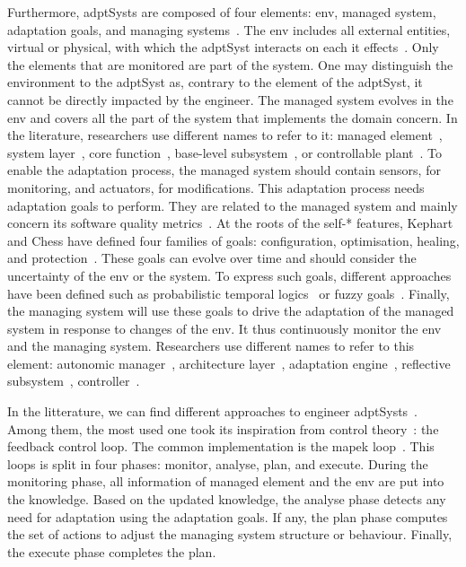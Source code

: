 Furthermore, \glspl{adptSyst} are composed of four elements: \gls{env}, managed system, adaptation goals, and managing systems~\cite{DBLP:books/sp/19/Weyns19}.
The \gls{env} includes all external entities, virtual or physical, with which the \gls{adptSyst} interacts on each it effects~\cite{DBLP:journals/ansoft/Jackson97}.
Only the elements that are monitored are part of the system.
One may distinguish the environment to the \gls{adptSyst} as, contrary to the element of the \gls{adptSyst}, it cannot be directly impacted by the engineer.
The managed system evolves in the \gls{env} and covers all the part of the system that implements the domain concern.
In the literature, researchers use different names to refer to it: managed element~\cite{DBLP:journals/computer/KephartC03}, system layer~\cite{DBLP:journals/computer/GarlanCHSS04}, core function~\cite{DBLP:journals/taas/SalehieT09}, base-level subsystem~\cite{DBLP:journals/taas/WeynsMA12}, or controllable plant~\cite{DBLP:conf/icse/FilieriHM14}.
To enable the adaptation process, the managed system should contain sensors, for monitoring, and actuators, for modifications.
This adaptation process needs adaptation goals to perform.
They are related to the managed system and mainly concern its software quality metrics~\cite{DBLP:conf/ecsa/WeynsA13}.
At the roots of the self-* features, Kephart and Chess have defined four families of goals: configuration, optimisation, healing, and protection~\cite{DBLP:journals/computer/KephartC03}.  
These goals can evolve over time and should consider the uncertainty of the \gls{env} or the system.
To express such goals, different approaches have been defined such as probabilistic temporal logics~\cite{DBLP:journals/tse/CalinescuGKMT11} or fuzzy goals~\cite{DBLP:conf/re/BaresiPS10}.
Finally, the managing system will use these goals to drive the adaptation of the managed system in response to changes of the \gls{env}.
It thus continuously monitor the \gls{env} and the managing system.
Researchers use different names to refer to this element: autonomic manager~\cite{DBLP:journals/computer/KephartC03}, architecture layer~\cite{DBLP:journals/computer/GarlanCHSS04}, adaptation engine~\cite{DBLP:journals/taas/SalehieT09}, reflective subsystem~\cite{DBLP:journals/taas/WeynsMA12}, controller~\cite{DBLP:conf/icse/FilieriHM14}.

In the litterature, we can find different approaches to engineer \glspl{adptSyst}~\cite{DBLP:journals/computer/GarlanCHSS04}.
Among them, the most used one took its inspiration from control theory~\cite{DBLP:conf/dagstuhl/BrunSGGKLMPS09}: the feedback control loop.
The common implementation is the \gls{mapek} loop~\cite{DBLP:journals/computer/KephartC03, computing2006architectural}.
This loops is split in four phases: monitor, analyse, plan, and execute.
During the monitoring phase, all information of managed element and the \gls{env} are put into the knowledge.
Based on the updated knowledge, the analyse phase detects any need for adaptation using the adaptation goals.
If any, the plan phase computes the set of actions to adjust the managing system structure or behaviour.
Finally, the execute phase completes the plan.

